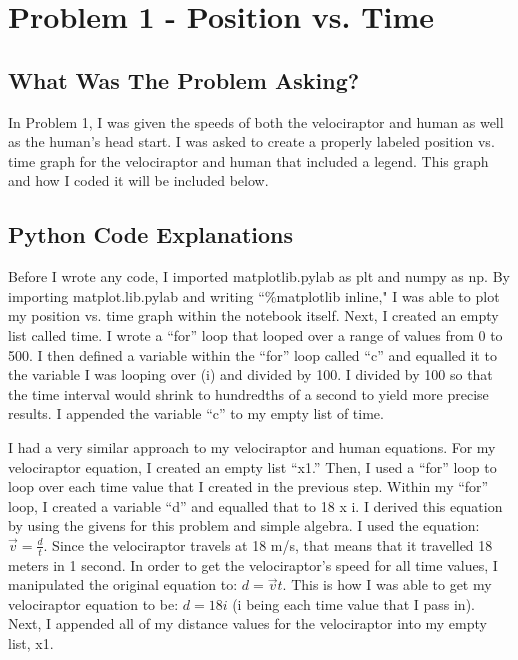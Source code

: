 \documentclass[twocolumn]{revtex4}
\begin{document}
\section{Problem 1 - Position vs. Time}

\subsection{What Was The Problem Asking?}
In Problem 1, I was given the speeds of both the velociraptor and human as well as the human's head start. I was asked to create a properly labeled position vs. time graph for the velociraptor and human that included a legend. This graph and how I coded it will be included below. 

\subsection{Python Code Explanations}
Before I wrote any code, I imported matplotlib.pylab as plt and numpy as np. By importing matplot.lib.pylab and writing ``\%matplotlib inline," I was able to plot my position vs. time graph within the notebook itself. Next, I created an empty list called time. I wrote a ``for'' loop that looped over a range of values from 0 to 500. I then defined a variable within the ``for'' loop called ``c'' and equalled it to the variable I was looping over (i) and divided by 100. I divided by 100 so that the time interval would shrink to hundredths of a second to yield more precise results. I appended the variable ``c'' to my empty list of time.

I had a very similar approach to my velociraptor and human equations. For my velociraptor equation, I created an empty list ``x1.'' Then, I used a ``for'' loop to loop over each time value that I created in the previous step. Within my ``for'' loop, I created a variable ``d'' and equalled that to 18 x i. I derived this equation by using the givens for this problem and simple algebra. I used the equation: $ \vec{v} = \frac{d}{t}.$ Since the velociraptor travels at 18 m/s, that means that it travelled 18 meters in 1 second. In order to get the velociraptor's speed for all time values, I manipulated the original equation to: $d = \vec{v}t.$ This is how I was able to get my velociraptor equation to be: $d=18i$ (i being each time value that I pass in). Next, I appended all of my distance values for the velociraptor into my empty list, x1.
\end{document}
